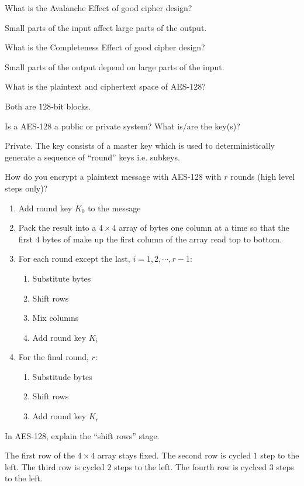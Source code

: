 \documentclass{article}
\newcounter{qcounter}
\newcommand{\showqcounter}{\theqcounter}
\newcommand{\question}{\vspace{5mm}\addtocounter{qcounter}{1}\vspace{5mm}{\bf Q\showqcounter: }}
\newcommand{\answer}{\vspace{5mm}{\bf A\showqcounter: }}
\begin{document}
\question What is the Avalanche Effect of good cipher design?

\answer Small parts of the input affect large parts of the output.


\question What is the Completeness Effect of good cipher design?

\answer Small parts of the output depend on large parts of the input.


\question What is the plaintext and ciphertext space of AES-128?

\answer Both are $128$-bit blocks.


\question Is a AES-128 a public or private system? What is/are the key(s)?

\answer Private. The key consists of a master key which is used to deterministically generate a sequence of ``round'' keys i.e. subkeys.


\question How do you encrypt a plaintext message with AES-128 with $r$ rounds (high level steps only)?

\answer 
  \begin{enumerate}
    \item Add round key $K_0$ to the message
    \item Pack the result into a $4 \times 4$ array of bytes one column at a time so that the first $4$ bytes of  
      make up the first column of the array read top to bottom.
    \item For each round except the last, $i = 1, 2, \cdots, r - 1$:
      \begin{enumerate}
        \item Substitute bytes
        \item Shift rows
        \item Mix columns
        \item Add round key $K_i$
      \end{enumerate}
    \item For the final round, $r$:
      \begin{enumerate}
        \item Substitude bytes
        \item Shift rows
        \item Add round key $K_r$
      \end{enumerate}
  \end{enumerate}


\question In AES-128, explain the ``shift rows'' stage.

\answer The first row of the $4 \times 4$ array stays fixed. The second row is cycled $1$ step to the left. The third row is 
  cycled $2$ steps to the left. The fourth row is cyclced $3$ steps to the left.
\end{document}
